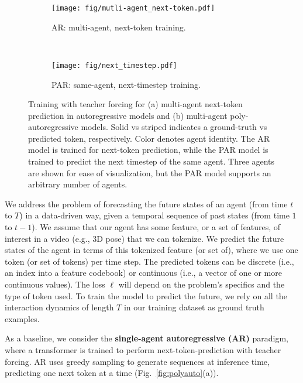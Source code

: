 \begin{figure}
    \centering
    \begin{subfigure}[b]{0.49\textwidth}
        \texttt{[image: fig/mutli-agent\_next-token.pdf]}
        \caption{AR: multi-agent, next-token training.}
        \label{fig:AR_multiagent_nexttoken}
    \end{subfigure}
    ~
    \begin{subfigure}[b]{0.49\textwidth}
        \texttt{[image: fig/next\_timestep.pdf]}
        \caption{PAR: same-agent, next-timestep training.}
        \label{fig:PAR_nexttimestep}
    \end{subfigure}    
    \caption{Training with teacher forcing for (a) multi-agent next-token prediction in autoregressive models and (b) multi-agent poly-autoregressive models. Solid vs striped indicates a ground-truth vs predicted token, respectively. Color denotes agent identity. The AR model is trained for next-token prediction, while the PAR model is trained to predict the next timestep of the same agent. Three agents are shown for ease of visualization, but the PAR model supports an arbitrary number of agents.}
    \label{fig:PAR_training}
\vspace{-.75cm}
\end{figure}

We address the problem of forecasting the future states of an agent (from time $t$ to $T$) in a data-driven way, given a temporal sequence of past states (from time $1$ to $t-1$). 
We assume that our agent has some feature, or a set of features, of interest in a video (e.g., 3D pose) that we can tokenize. We predict the future states of the agent in terms of this tokenized feature (or set of), where we use one token (or set of tokens) per time step. The predicted tokens can be discrete (i.e., an index into a feature codebook) or continuous (i.e., a vector of one or more continuous values). The loss $\ell$ will depend on the problem's specifics and the type of token used. To train the model to predict the future, we rely on all the interaction dynamics of length $T$ in our training dataset as ground truth examples.


As a baseline, we consider the \textbf{single-agent autoregressive (AR)} paradigm, where a transformer is trained to perform next-token-prediction with teacher forcing. AR uses greedy sampling to generate sequences at inference time, predicting one next token at a time (Fig.~\ref{fig:polyauto}(a)). 

